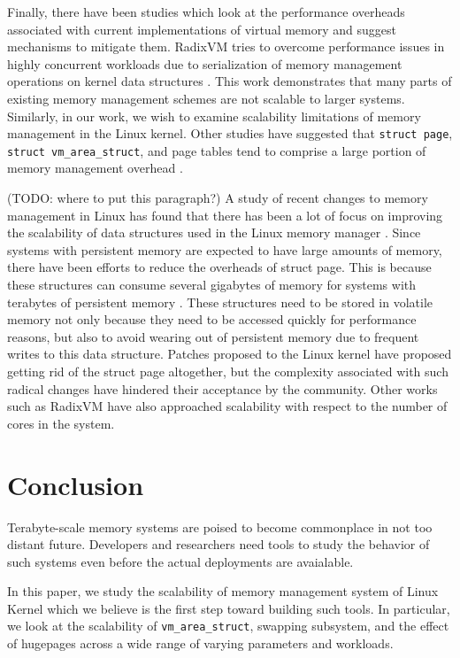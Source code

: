 \documentclass[twocolumn,11pt]{article}
\begin{document}
Finally, there have been studies which look at the performance overheads
associated with current implementations of virtual memory and suggest mechanisms
to mitigate them. RadixVM tries to overcome performance issues in highly
concurrent workloads due to serialization of memory management operations on
kernel data structures \cite{radixvm}. This work demonstrates that many parts of
existing memory management schemes are not scalable to larger systems.
Similarly, in our work, we wish to examine scalability limitations of memory
management in the Linux kernel. Other studies have suggested that \texttt{struct
page}, \texttt{struct vm\_area\_struct}, and page tables tend to comprise a
large portion of memory management overhead \cite{simics, struct_page}. 


(TODO: where to put this paragraph?)
A study of recent changes to memory management in Linux has found that there
has been a lot of focus on improving the scalability of data structures used in
the Linux memory manager \cite{huang2016evolutionary}. Since systems with
persistent memory are expected to have large amounts of memory, there have been
efforts to reduce the overheads of struct page. This is because these
structures can consume several gigabytes of memory for systems with terabytes
of persistent memory \cite{corbet_persistent_progress}. These structures need
to be stored in volatile memory not only because they need to be accessed
quickly for performance reasons, but also to avoid wearing out of persistent
memory due to frequent writes to this data structure. Patches proposed to the
Linux kernel have proposed getting rid of the struct page altogether, but the
complexity associated with such radical changes have hindered their acceptance
by the community. Other works such as RadixVM \cite{radixvm} have also
approached scalability with respect to the number of cores in the system.


\section{Conclusion}
Terabyte-scale memory systems are poised to become commonplace in not too distant future.
Developers and researchers need tools to study the behavior of such systems even before the actual
deployments are avaialable. 

In this paper, we study the scalability of memory management 
system of Linux Kernel which we believe is the first step toward building such tools. In particular, 
we look at the scalability of \texttt{vm\_area\_struct},  
swapping subsystem, and the effect of hugepages across a wide range of varying parameters
and workloads. 
\end{document}
